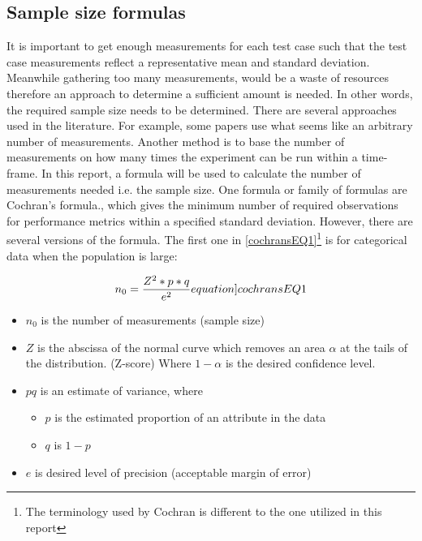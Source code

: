 \subsection{Sample size formulas}\label{subsec:cock}
It is important to get enough measurements for each test case such that the test case measurements reflect a representative mean and standard deviation. Meanwhile gathering too many measurements, would be a waste of resources therefore an approach to determine a sufficient amount is needed. In other words, the required sample size needs to be determined. There are several approaches used in the literature. For example, some papers use what seems like an arbitrary number of measurements\cite{Pereira2017,Koedijk2022diff,Georgiou2020}. Another method is to base the number of measurements on how many times the experiment can be run within a time-frame\cite{sestoft2013microbenchmarks}. In this report, a formula will be used to calculate the number of measurements needed i.e. the sample size. One formula or family of formulas are Cochran's formula.\cite{Cochran, kotrlik2001organizational,israel1992determining}, which gives the minimum number of required observations for performance metrics within a specified standard deviation. However, there are several versions of the formula.
The first one in \cref{cochransEQ1}\footnote{The terminology used by Cochran is different to the one utilized in this report} is for categorical data when the population is large\cite{israel1992determining}:

\begin{equation}
    n_0 = \frac{Z^2*p*q}{e^2}
    \label[equation]{cochransEQ1}
\end{equation}

\begin{itemize}
    \item $n_0$ is the number of measurements (sample size)
    \item $Z$ is the abscissa of the normal curve which removes an area $\alpha$ at the tails of the distribution. (Z-score) Where $1 - \alpha$ is the desired confidence level.%
    \item $pq$ is an estimate of variance, where
    \begin{itemize}
        \item $p$ is the estimated proportion of an attribute in the data
        \item $q$ is $1 - p$
    \end{itemize}
    \item $e$ is desired level of precision (acceptable margin of error)
\end{itemize}


